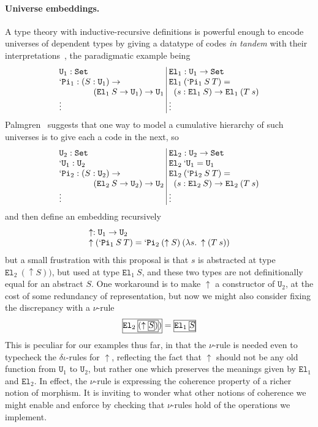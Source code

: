 \documentclass[preprint]{sigplanconf}
\begin{document}
\paragraph{Universe embeddings.} A type theory with
inductive-recursive definitions is powerful enough to encode universes
of dependent types by giving a datatype of codes \emph{in tandem} with
their interpretations~\cite{DBLP:conf/tlca/DybjerS99}, the paradigmatic
example being
\[\begin{array}{@{}l@{\;}|@{\;}l@{}}
\mathtt{U}_1 : \mathtt{Set}
  & \mathtt{El}_1 : \mathtt{U}_1 \to \mathtt{Set} \\
\mathtt{`Pi}_1 : (S:\mathtt{U}_1)\to
  & \mathtt{El}_1\:(\mathtt{`Pi}_1\:S\:T) = \\
\qquad\qquad(\mathtt{El}_1\:S\to \mathtt{U}_1 )\to\mathtt{U}_1 &
\;\;(s : \mathtt{El}_1\:S)\to
  \mathtt{El}_1\:(T\:s) \\
\vdots & \vdots
\end{array}\]
Palmgren~\cite{Palmgren:universes} suggests that one way to model a
cumulative hierarchy of such universes is to give each a code in the
next, so
\[\begin{array}{@{}l@{\;}|@{\;}l@{}}
\mathtt{U}_2 : \mathtt{Set}
  & \mathtt{El}_2 : \mathtt{U}_2 \to \mathtt{Set} \\
\mathtt{`U}_1 : \mathtt{U}_2
  & \mathtt{El}_2\:\mathtt{`U}_1 = \mathtt{U}_1 \\
\mathtt{`Pi}_2 : (S:\mathtt{U}_2)\to
  & \mathtt{El}_2\:(\mathtt{`Pi}_2\:S\:T) = \\
\qquad\qquad(\mathtt{El}_2\:S\to \mathtt{U}_2 )\to\mathtt{U}_2 &
\;\;(s : \mathtt{El}_2\:S)\to
  \mathtt{El}_2\:(T\:s) \\
\vdots & \vdots
\end{array}\]
and then define an embedding recursively
\[\begin{array}{l}
\uparrow : \mathtt{U}_1 \to \mathtt{U}_2 \\
\uparrow(\mathtt{`Pi}_1\:S\:T) =
  \mathtt{`Pi}_2\:(\uparrow S)\:(\lambda s.\:\uparrow(T\:s))
\end{array}\]
but a small frustration with this proposal is that $s$ is abstracted at
type $\mathtt{El}_2\:(\uparrow S))$, but used at type
$\mathtt{El}_1\:S$, and these two types are not definitionally equal
for an abstract $S$. One workaround is to make $\uparrow$ a
constructor of $\mathtt{U}_2$, at the cost of some redundancy of
representation, but now we might also consider fixing the discrepancy
with a $\nu$-rule
\[
  \fbc{$\mathtt{El}_2\:\fbb{$(\uparrow \fba{$S$})$}) $} =
    \fbb{$\mathtt{El}_1\:\fba{$S$}$}
\]
This is peculiar for our examples thus far, in that the $\nu$-rule is
needed even to typecheck the $\delta\iota$-rules for $\uparrow$,
reflecting the fact that $\uparrow$ should not be any old function
from $\mathtt{U}_1$ to $\mathtt{U}_2$, but rather one which preserves
the meanings given by $\mathtt{El}_1$ and $\mathtt{El}_2$. In effect,
the $\nu$-rule is expressing the coherence property of a richer notion
of morphism. It is inviting to wonder what other notions of coherence
we might enable and enforce by checking that $\nu$-rules hold of the
operations we implement.
\end{document}
